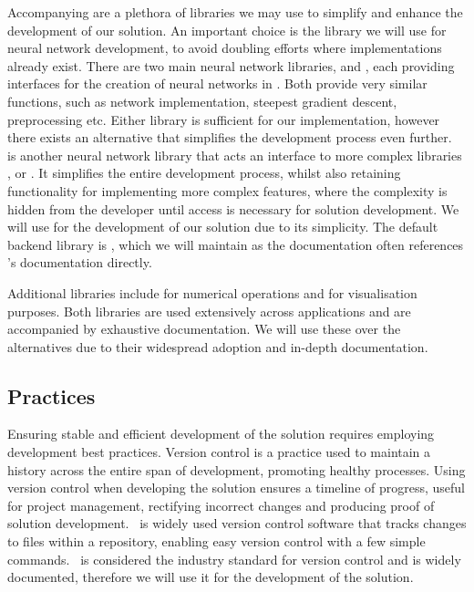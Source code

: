 Accompanying  are a plethora of libraries we may use to simplify and enhance the development of our solution. An important choice is the library we will use for neural network development, to avoid doubling efforts where implementations already exist. There are two main neural network libraries,  and , each providing interfaces for the creation of neural networks in . Both provide very similar functions, such as network implementation, steepest gradient descent, preprocessing etc. Either library is sufficient for our implementation, however there exists an alternative that simplifies the development process even further.\  is another neural network library that acts an interface to more complex libraries ,  or . It simplifies the entire development process, whilst also retaining functionality for implementing more complex features, where the complexity is hidden from the developer until access is necessary for solution development. We will use  for the development of our solution due to its simplicity. The default backend library is , which we will maintain as the  documentation often references 's documentation directly.

Additional  libraries include  for numerical operations and  for visualisation purposes. Both libraries are used extensively across  applications and are accompanied by exhaustive documentation. We will use these over the alternatives due to their widespread adoption and in-depth documentation.

\subsection{Practices}
Ensuring stable and efficient development of the solution requires employing development best practices. Version control is a practice used to maintain a history across the entire span of development, promoting healthy processes. Using version control when developing the solution ensures a timeline of progress, useful for project management, rectifying incorrect changes and producing proof of solution development.\  is widely used version control software that tracks changes to files within a repository, enabling easy version control with a few simple commands.\  is considered the industry standard for version control and is widely documented, therefore we will use it for the development of the solution.

